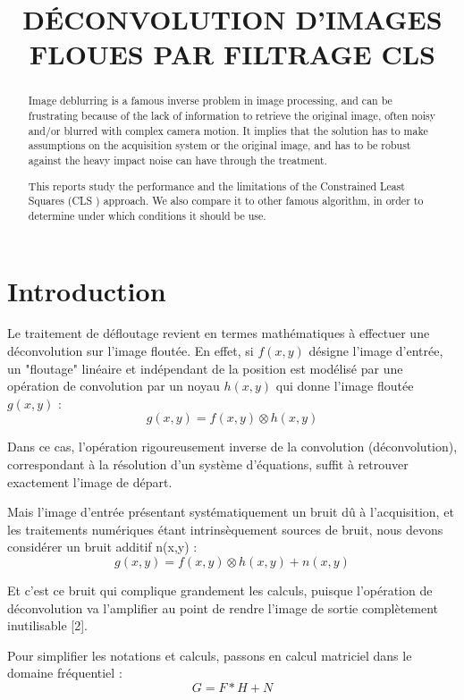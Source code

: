 \documentclass{article}
\title{D\'{E}CONVOLUTION D'IMAGES FLOUES PAR FILTRAGE CLS}
\begin{document}
%
\maketitle
%
\begin{abstract}
	
	Image deblurring is a famous inverse problem in image processing, and can be frustrating because of the lack of information to retrieve the original image, often noisy and/or blurred with complex camera motion. It implies that the solution has to make assumptions on the acquisition system or the original image, and has to be robust against the heavy impact noise can have through the treatment.
	
	This reports study the performance and the limitations of the Constrained Least Squares (CLS ) approach. We also compare it to other famous algorithm, in order to determine under which conditions it should be use.
	
\end{abstract}
%

%
\section{Introduction}
\label{sec:intro}

	Le traitement de défloutage revient en termes mathématiques à effectuer une déconvolution sur l'image floutée. En effet, si $f(x,y)$ désigne l'image d'entrée, un "floutage" linéaire et indépendant de la position est modélisé par une opération de convolution par un noyau $h(x,y)$ qui donne l'image floutée $g(x,y)$ :
	$$g(x,y) = f(x,y) \otimes h(x,y)$$ 
	
	Dans ce cas, l'opération rigoureusement inverse de la convolution (déconvolution), correspondant à la résolution d'un système d'équations, suffit à retrouver exactement l'image de départ.
	
	Mais l'image d'entrée présentant systématiquement un bruit dû à l'acquisition, et les traitements numériques étant intrinsèquement sources de bruit, nous devons considérer un bruit additif n(x,y) : 
	$$g(x,y) = f(x,y) \otimes h(x,y) + n(x,y)$$ 
	
	Et c'est ce bruit qui complique grandement les calculs, puisque l'opération de déconvolution va l'amplifier au point de rendre l'image de sortie complètement inutilisable [2].
	
	Pour simplifier les notations et calculs, passons en calcul matriciel dans le domaine fréquentiel : 
	$$G = F * H + N$$
	
\end{document}

